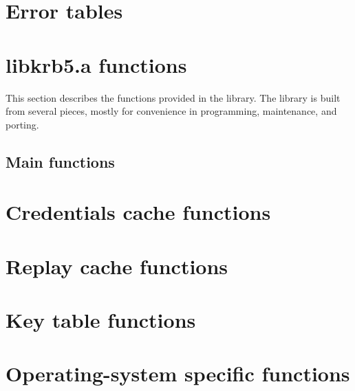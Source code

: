 \section{Error tables}


\newpage

\section{libkrb5.a functions}
This section describes the functions provided in the 
library.  The library is built from several pieces, mostly for convenience in
programming, maintenance, and porting.

\ifdraft\sloppy\fi

\subsection{Main functions}


\section{Credentials cache functions}


\section{Replay cache functions}


\section{Key table functions}


\section{Operating-system specific functions}


\appendix
\cleardoublepage


